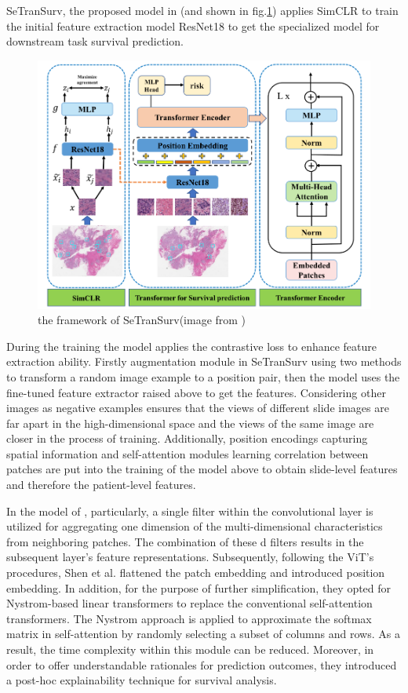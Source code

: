\documentclass[journal,twoside,web]{ieeecolor}
\begin{document}
SeTranSurv, the proposed model in \cite{huang2021integration}(and shown in fig.\ref{SeTranSurv}) applies SimCLR to train the initial feature extraction model ResNet18\cite{he2016deep} to get the specialized model for downstream task survival prediction.
\begin{figure}
    \centering
    \includegraphics[width=0.8\linewidth]{img/setran.png}
    \caption{the framework of SeTranSurv(image from \cite{huang2021integration})}
    \label{SeTranSurv}
\end{figure}
During the training the model applies the contrastive loss\cite{he2020momentum} to enhance feature extraction ability.
Firstly augmentation module in SeTranSurv using two methods to transform a random image example to a position pair, then the model uses the fine-tuned feature extractor raised above to get the features. 
Considering other images as negative examples ensures that the views of different slide images are far apart in the high-dimensional space and the views of the same image are closer in the process of training.
Additionally, position encodings capturing spatial information and self-attention modules learning correlation between patches are put into the training of the model above to obtain slide-level features and therefore the patient-level features.

In the model of \cite{shen2022explainable}, particularly, a single filter within the convolutional layer is utilized for aggregating one dimension of the multi-dimensional characteristics from neighboring patches. 
The combination of these d filters results in the subsequent layer's feature representations.
Subsequently, following the ViT's procedures, Shen et al. flattened the patch embedding and introduced position embedding. 
In addition, for the purpose of further simplification, they opted for Nystrom-based linear transformers\cite{verma2021beyond} to replace the conventional self-attention transformers. 
The Nystrom approach is applied to approximate the softmax matrix in self-attention by randomly selecting a subset of columns and rows. 
As a result, the time complexity within this module can be reduced.
Moreover, in order to offer understandable rationales for prediction outcomes, they introduced a post-hoc explainability technique for survival analysis.
\end{document}
